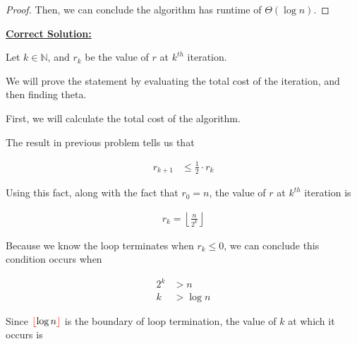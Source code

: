 \documentclass[12pt]{article}
\begin{document}
\begin{enumerate}[a.]
\begin{proof}
        \bigskip

        Then, we can conclude the algorithm has runtime of $\Theta(\log n)$.

    \end{proof}

    \bigskip

    \begin{mdframed}
        \underline{\textbf{Correct Solution:}}

        \bigskip

        Let $k \in \mathbb{N}$, and $r_k$ be the value of $r$ at $k^{th}$ iteration.

        \bigskip

        We will prove the statement by evaluating the total cost of the
        \color{red}iteration\color{black}, and then finding theta.

        \bigskip

        First, we will calculate the total cost of the algorithm.

        \bigskip

        The result in previous problem tells us that

        \setcounter{equation}{0}
        \begin{align}
            r_{k+1} &\leq \frac{1}{2} \cdot r_k
        \end{align}

        \bigskip

        Using this fact, along with the fact that $r_0 = n$, the value of $r$ at $k^{th}$ iteration is

        \begin{align}
            r_k = \left\lfloor \frac{n}{2^k} \right\rfloor
        \end{align}

        \bigskip

        Because we know the loop terminates when $r_k \leq 0$, we can conclude this
        condition occurs when

        \begin{align}
            2^k &> n\\
            k &> \log n
        \end{align}

        \bigskip

        Since $\color{red}\lfloor\color{black} \log n \color{red}\rfloor\color{black}$ is the boundary of loop termination, the value of $k$
        at which it occurs is


\end{mdframed}
\end{enumerate}
\end{document}
